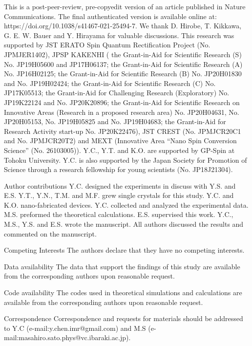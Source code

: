 \documentclass{nature}
\begin{document}
\begin{addendum}
 \item
 This is a post-peer-review, pre-copyedit version of an article published in Nature
Communications. The final authenticated version is available online at: 
 https://doi.org/10.1038/s41467-021-25494-7.
 We thank D. Hirobe, T. Kikkawa, G. E. W. Bauer and Y. Hirayama for valuable discussions. 
 This research was supported by JST ERATO Spin Quantum Rectification Project (No. JPMJER1402), JPSP KAKENHI (
 the Grant-in-Aid for Scientific Research (S) No. JP19H05600 and JP17H06137;
 the Grant-in-Aid for Scientific Research (A) No. JP16H02125;
 the Grant-in-Aid for Scientific Research (B) No. JP20H01830 and No. JP19H02424; 
the Grant-in-Aid for Scientific Research (C) No. JP17K05513;
the Grant-in-Aid for Challenging Research (Exploratory) No. JP19K22124 and No. JP20K20896;
the Grant-in-Aid for Scientific Research on Innovative Areas (Research in a proposed research area) No. JP20H04631, No. JP20H05153, No. JP19H05825 and No. JP19H04683;
the Grant-in-Aid for Research Activity start-up No. JP20K22476), JST CREST (No. JPMJCR20C1 and No. JPMJCR20T2) and MEXT (Innovative Area ``Nano Spin Conversion Science'' (No. 26103005)). Y.C., Y.T. and K.O. are supported by GP-Spin at Tohoku University. Y.C. is also supported by the Japan Society for Promotion of Science through a research fellowship for young scientists (No. JP18J21304). 
 \item[Author contributions] 
 Y.C. designed the experiments in discuss with Y.S. and E.S. Y.T., Y.N., T.M. and M.F. grew single crystals for this study. Y.C. and K.O. nano-fabricated devices. Y.C. collected and analyzed the experimental data. M.S. preformed the theoretical calculations. E.S. supervised this work. Y.C., M.S., Y.S. and E.S. wrote the manuscript. All authors discussed the results and commented on the manuscript.
  \item[Competing Interests] The authors declare that they have no competing interests.
\item[Data availability] The data that support the findings of this study are available from the corresponding
authors upon reasonable request.
\item[Code availability]
The codes used in theoretical simulations and calculations are available from the corresponding authors upon reasonable request.

\item[Correspondence] Correspondence and requests for materials
should be addressed to Y.C (e-mail:\newline y.chen.imr@gmail.com) and M.S (e-mail:masahiro.sato.phys@vc.ibaraki.ac.jp).
\end{addendum}
\end{document}
